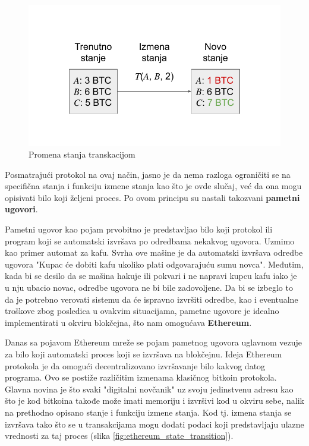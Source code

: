 \documentclass[a4paper]{article}
\begin{document}
{\begin{figure}[H]
    \centering
        \includegraphics[scale=0.6]{State_Transition.pdf}
    \caption{Promena stanja transkacijom}
    \label{fig:state_diagram}
\end{figure}


Posmatrajući protokol na ovaj način, jasno je da nema razloga ograničiti se na specifična stanja i funkciju izmene stanja kao što je ovde slučaj, već da ona mogu opisivati bilo koji željeni proces.
Po ovom principu su nastali takozvani \textbf{pametni ugovori}.

Pametni ugovor kao pojam prvobitno je predstavljao bilo koji protokol ili program koji se automatski izvršava po odredbama nekakvog ugovora.
Uzmimo kao primer automat za kafu.
Svrha ove mašine je da automatski izvršava odredbe ugovora "Kupac će dobiti kafu ukoliko plati odgovarajuću sumu novca". Međutim, kada bi se desilo da se mašina hakuje ili pokvari i ne napravi kupcu kafu iako je u nju ubacio novac, odredbe ugovora ne bi bile zadovoljene.
Da bi se izbeglo to da je potrebno verovati sistemu da će ispravno izvršiti odredbe, kao i eventualne troškove zbog posledica u ovakvim situacijama, pametne ugovore je idealno implementirati u okviru blokčejna, što nam omogućava \textbf{Ethereum}.

Danas sa pojavom Ethereum mreže se pojam pametnog ugovora uglavnom vezuje za bilo koji automatski proces koji se izvršava na blokčejnu.
Ideja Ethereum protokola je da omogući decentralizovano izvršavanje bilo kakvog datog programa. Ovo se postiže različitim izmenama klasičnog bitkoin protokola.
Glavna novina je što svaki "digitalni novčanik" uz svoju jedinstvenu adresu kao što je kod bitkoina takođe može imati memoriju i izvršivi kod u okviru sebe, nalik na prethodno opisano stanje i funkciju izmene stanja.
Kod tj. izmena stanja se izvršava tako što se u transakcijama mogu dodati podaci koji predstavljaju ulazne vrednosti za taj proces (slika \ref{fig:ethereum_state_transition}).

}
\end{document}
